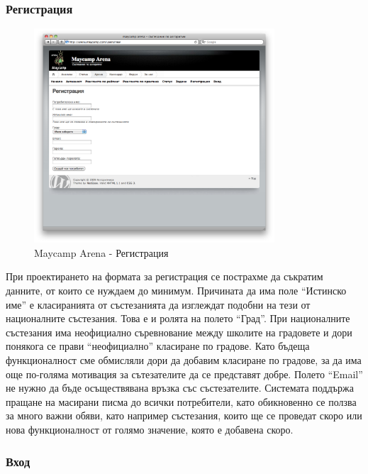 \documentclass[a4paper,12pt]{article}
\begin{document}
  \subsubsection{Регистрация}
  
  \begin{figure}[ht]
    \begin{center}
      \includegraphics[width=0.8\textwidth]{images/maycamp_arena_register.png}
    \end{center}
    \caption{Maycamp Arena - Регистрация}
    \label{arena_register}
  \end{figure}
  
  При проектирането на формата за регистрация се пострахме да съкратим данните, от които се нуждаем до минимум. Причината да има поле ``Истинско име'' е класиранията от състезанията да изглеждат подобни на тези от националните състезания. Това е и ролята на полето ``Град''. При националните състезания има неофициално съревнование между школите на градовете и дори понякога се прави ``неофициално'' класиране по градове. Като бъдеща функционалност сме обмисляли дори да добавим класиране по градове, за да има още по-голяма мотивация за сътезателите да се представят добре.
  Полето ``Email'' не нужно да бъде осъществявана връзка със състезателите. Системата поддържа пращане на масирани писма до всички потребители, като обикновенно се ползва за много важни обяви, като например състезания, които ще се проведат скоро или нова функционалност от голямо значение, която е добавена скоро.
    
  \subsubsection{Вход}
\end{document}
